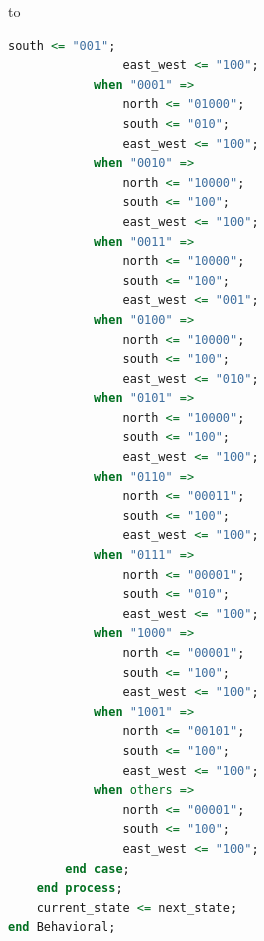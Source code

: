 to\documentclass[11pt]{article}
\begin{document}
\begin{appendices}
\begin{lstlisting}[language=VHDL]
                south <= "001";
                east_west <= "100";
            when "0001" =>
                north <= "01000";
                south <= "010";
                east_west <= "100";
            when "0010" =>
                north <= "10000";
                south <= "100";
                east_west <= "100";
            when "0011" =>
                north <= "10000";
                south <= "100";
                east_west <= "001";
            when "0100" =>
                north <= "10000";
                south <= "100";
                east_west <= "010";
            when "0101" =>
                north <= "10000";
                south <= "100";
                east_west <= "100";
            when "0110" =>
                north <= "00011";
                south <= "100";
                east_west <= "100";
            when "0111" =>
                north <= "00001";
                south <= "010";
                east_west <= "100";
            when "1000" =>
                north <= "00001";
                south <= "100";
                east_west <= "100";
            when "1001" =>
                north <= "00101";
                south <= "100";
                east_west <= "100";
            when others =>
                north <= "00001";
                south <= "100";
                east_west <= "100";
        end case;
    end process;
    current_state <= next_state;
end Behavioral;
\end{lstlisting}


\end{appendices}
\end{document}
